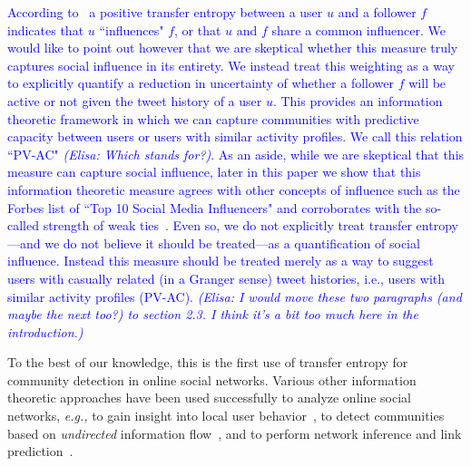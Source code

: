 \textcolor{blue}{According to~\cite{ver2012information} a positive transfer entropy between a user $u$ and a follower $f$ indicates that $u$ ``influences" $f$, or that $u$ and $f$ share a common influencer. We would like to point out however that we are skeptical whether this measure truly captures social influence in its entirety. We instead treat this weighting as a way to explicitly quantify a reduction in uncertainty of whether a follower $f$ will be active or not given the tweet history of a user $u$. This provides an information theoretic framework in which we can capture communities with predictive capacity between users or users with similar activity profiles. We call this relation ``PV-AC" \textit{(Elisa: Which stands for?)}. As an aside, while we are skeptical that this measure can capture social influence, later in this paper we show that this information theoretic measure agrees with other concepts of influence such as the Forbes list of ``Top 10 Social Media Influencers" and corroborates with the so-called strength of weak ties~\cite{granovetter1973strength}. Even so, we do not explicitly treat transfer entropy---and we do not believe it should be treated---as a quantification of social influence. Instead this measure should be treated merely as a way to suggest users with casually related (in a Granger sense) tweet histories, i.e., users with similar activity profiles (PV-AC). \textit{(Elisa: I would move these two paragraphs (and maybe the next too?) to section 2.3. I think it's a bit too much here in the introduction.)}}


To the best of our knowledge, this is the first use of transfer entropy for community detection in online social networks. Various other information theoretic approaches have been used successfully to analyze online social networks, \emph{e.g.,} to gain insight into local user behavior~\cite{darmon2013understanding}, to detect communities based on \emph{undirected} information flow~\cite{darmon2013detecting}, and to perform network inference and link prediction~\cite{ver2012information}.


